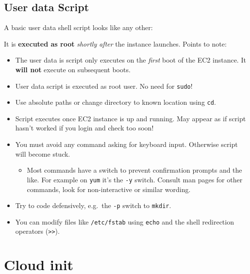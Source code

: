 \subsection{User data Script}\label{user-data-script}

A basic user data shell script looks like any other:

\begin{Shaded}
\begin{Highlighting}[]

 
\end{Highlighting}
\end{Shaded}

It is \textbf{executed as root} \emph{shortly after} the instance
launches. Points to note:

\begin{itemize}
\item
  The user data is script only executes on the \emph{first} boot of the
  EC2 instance. It \textbf{will not} execute on subsequent boots.
\item
  User data script is executed as root user. No need for \texttt{sudo}!
\item
  Use absolute paths or change directory to known location using
  \texttt{cd}.
\item
  Script executes once EC2 instance is up and running. May appear as if
  script hasn't worked if you login and check too soon!
\item
  You must avoid any command asking for keyboard input. Otherwise script
  will become stuck.

  \begin{itemize}
  \tightlist
  \item
    Most commands have a switch to prevent confirmation prompts and the
    like. For example on \texttt{yum} it's the \texttt{-y} switch.
    Consult man pages for other commands, look for non-interactive or
    similar wording.
  \end{itemize}
\item
  Try to code defensively, e.g.~the \texttt{-p} switch to
  \texttt{mkdir}.
\item
  You can modify files like \texttt{/etc/fstab} using \texttt{echo} and
  the shell redirection operators
  (\texttt{\textgreater{}\textgreater{}}).
\end{itemize}

\section{Cloud init}\label{cloud-init}

